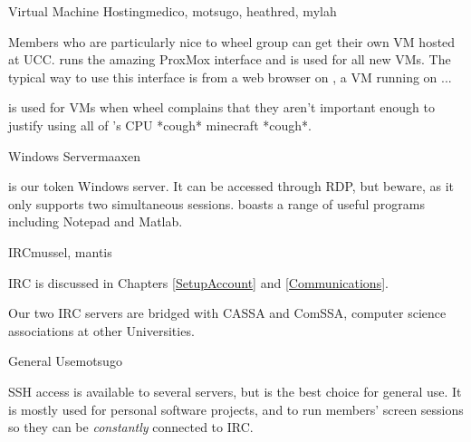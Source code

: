 \begin{uccservice}{Virtual Machine Hosting}{medico, motsugo, heathred, mylah}

Members who are particularly nice to wheel group can get their own VM hosted at UCC.  runs the amazing ProxMox interface and is used for all new VMs. The typical way to use this interface is from a web browser on , a VM running on ...

 is used for VMs when wheel complains that they aren't important enough to justify using all of 's CPU *cough* minecraft *cough*.

\end{uccservice}

\begin{uccservice}{Windows Server}{maaxen}

 is our token Windows server. It can be accessed through RDP, but beware, as it only supports two simultaneous sessions.  boasts a range of useful programs including Notepad and Matlab.

\end{uccservice}

\begin{uccservice}{IRC}{mussel, mantis}

IRC is discussed in Chapters \ref{SetupAccount} and \ref{Communications}.

Our two IRC servers are bridged with CASSA and ComSSA, computer science associations at other Universities.

\end{uccservice}

\begin{uccservice}{General Use}{motsugo}

SSH access is available to several servers, but  is the best choice for general use. It is mostly used for personal software projects, and to run members' screen sessions so they can be \emph{constantly} connected to IRC.

\end{uccservice}

